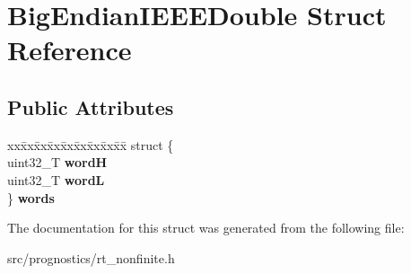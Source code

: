 \hypertarget{structBigEndianIEEEDouble}{}\section{Big\+Endian\+I\+E\+E\+E\+Double Struct Reference}
\label{structBigEndianIEEEDouble}
\subsection*{Public Attributes}
\begin{DoxyCompactItemize}
\item 
\mbox{\label{structBigEndianIEEEDouble_afc3f84b68d04e124fc08b9ac6cb9c403}} 
\begin{tabbing}
xx\=xx\=xx\=xx\=xx\=xx\=xx\=xx\=xx\=\kill
struct \{\\
\>uint32\_T {\bfseries wordH}\\
\>uint32\_T {\bfseries wordL}\\
\} {\bfseries words}\\

\end{tabbing}\end{DoxyCompactItemize}


The documentation for this struct was generated from the following file\+:\begin{DoxyCompactItemize}
\item 
src/prognostics/rt\+\_\+nonfinite.\+h\end{DoxyCompactItemize}
